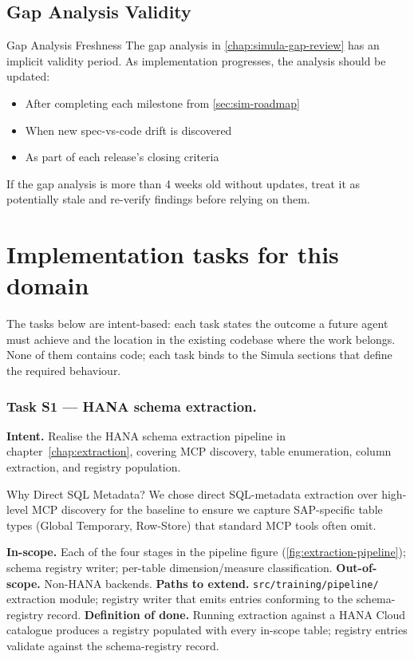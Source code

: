 \documentclass[12pt,a4paper,twoside]{report}
\begin{document}
\subsection{Gap Analysis Validity}

\begin{adrbox}{Gap Analysis Freshness}
The gap analysis in \cref{chap:simula-gap-review} has an implicit validity period.
As implementation progresses, the analysis should be updated:
\begin{itemize}
\item After completing each milestone from \cref{sec:sim-roadmap}
\item When new spec-vs-code drift is discovered
\item As part of each release's closing criteria
\end{itemize}
If the gap analysis is more than 4 weeks old without updates, treat it as
potentially stale and re-verify findings before relying on them.
\end{adrbox}

\section{Implementation tasks for this domain}
\label{sec:agent-tasks}
The tasks below are intent-based: each task states the outcome a
future agent must achieve and the location in the existing codebase
where the work belongs. None of them contains code; each task binds
to the Simula sections that define the required behaviour.

\subsubsection{Task S1 --- HANA schema extraction.}
\textbf{Intent.} Realise the HANA schema extraction pipeline in
chapter~\ref{chap:extraction}, covering MCP discovery, table
enumeration, column extraction, and registry population.

\begin{adrbox}{Why Direct SQL Metadata?}
We chose direct SQL-metadata extraction over high-level MCP discovery for the baseline to ensure we capture SAP-specific table types (Global Temporary, Row-Store) that standard MCP tools often omit.
\end{adrbox}

\textbf{In-scope.} Each of the four stages in the pipeline figure
(\ref{fig:extraction-pipeline}); schema registry writer; per-table
dimension/measure classification.
\textbf{Out-of-scope.} Non-HANA backends.
\textbf{Paths to extend.} \texttt{src/training/pipeline/} extraction
module; registry writer that emits entries conforming to the
schema-registry record.
\textbf{Definition of done.} Running extraction against a HANA
Cloud catalogue produces a registry populated with every in-scope
table; registry entries validate against the schema-registry record.
\end{document}
